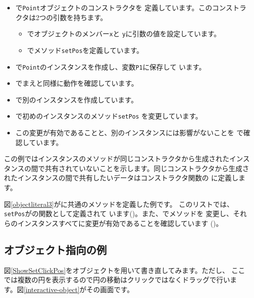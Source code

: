 \begin{itemize}
 \item {}で\texttt{Point}オブジェクトのコンストラクタを
       定義しています。このコンストラクタは2つの引数を持ちます。
\begin{itemize}
 \item {}でオブジェクトのメンバー\texttt{x}と
       \texttt{y}に引数の値を設定しています。
 \item {}でメソッド\texttt{setPos}を定義しています。
\end{itemize}
 \item {}で\texttt{Point}のインスタンスを作成し、変数\texttt{P1}に保存して
       います。
 \item {}でまえと同様に動作を確認しています。
 \item {}で別のインスタンスを作成しています。
 \item {}で初めのインスタンスのメソッド\texttt{setPos}
       を変更しています。
 \item この変更が有効であることと、別のインスタンスには影響がないことを
       で確認しています。
\end{itemize}
この例ではインスタンスのメソッドが同じコンストラクタから生成されたインス
タンスの間で共有されていないことを示します。同じコンストラクタから生成さ
れたインスタンスの間で共有したいデータはコンストラクタ関数の
に定義します。

図\ref{objectliteral3}がに共通のメソッドを定義した例です。
このリストでは、\texttt{setPos}がの関数として定義されて
います()。また、でメソッドを
変更し、それらのインスタンスすべてに変更が有効であることを確認しています
()。
\subsection{オブジェクト指向の例}
図\ref{ShowSetClickPos}をオブジェクトを用いて書き直してみます。ただし、
ここでは複数の円を表示するので円の移動はクリックではなくドラッグで行いま
す。図\ref{interactive-object}がその画面です。

